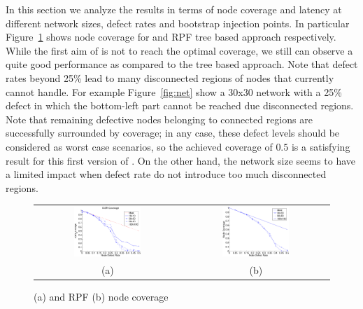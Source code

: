 In this section we analyze the results in terms of node
coverage and latency at different network sizes, defect rates and
bootstrap injection points.  In particular
Figure~\ref{fig:results_coverage} shows
node coverage for \disr{} and RPF tree based approach respectively. While
the first aim of \disr{} is not to reach the optimal coverage, we still
can observe a quite good performance as compared to the tree based
approach. Note that defect rates beyond 25\% lead to many disconnected
regions of nodes that \disr{} currently cannot handle.
For example Figure~\ref{fig:net} show a 30x30 network with a 25\%
defect in which the bottom-left part cannot be reached due
disconnected regions. Note that remaining defective nodes belonging to
connected regions are successfully surrounded by \disr{} coverage; in any
case, these defect levels should be considered as worst case scenarios, so the
achieved coverage of $0.5$ is a satisfying result for this first
version of \disr{}. On the other hand, the network size seems to have a
limited impact when defect rate do not introduce too much disconnected
regions. 
\begin{figure}
\centering
\begin{tabular}{cc}
\includegraphics[width=0.48\textwidth]{pictures/set1.eps} & 
\includegraphics[width=0.48\textwidth]{pictures/coverage.eps} \\
(a) & (b) 
\end{tabular}
\caption{\disr{} (a) and RPF (b) node coverage}
\label{fig:results_coverage}
\end{figure}

